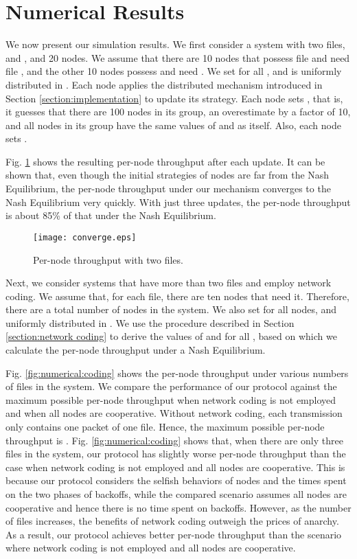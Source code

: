 \documentclass[11pt, conference]{IEEEtran}
\begin{document}
\section{Numerical Results} \label{section:numerical}

We now present our simulation results. We first consider a system with two files,  and , and 20 nodes. We assume that there are 10 nodes that possess file  and need file , and the other 10 nodes possess  and need . We set  for all , and  is uniformly distributed in . Each node applies the distributed mechanism introduced in Section \ref{section:implementation} to update its strategy. Each node  sets , that is, it guesses that there are 100 nodes in its group, an overestimate by a factor of 10, and all nodes in its group have the same values of  and  as itself. Also, each node sets .

Fig. \ref{fig:numerical:converge} shows the resulting per-node throughput after each update. It can be shown that, even though the initial strategies of nodes are far from the Nash Equilibrium, the per-node throughput under our mechanism converges to the Nash Equilibrium very quickly. With just three updates, the per-node throughput is about 85\% of that under the Nash Equilibrium.

\begin{figure}[t]
\texttt{[image: converge.eps]}
\caption{Per-node throughput with two files.} \label{fig:numerical:converge}
\end{figure}







Next, we consider systems that have more than two files and employ network coding. We assume that, for each file, there are ten nodes that need it. Therefore, there are a total number of  nodes in the system. We also set  for all nodes, and  uniformly distributed in . We use the procedure described in Section \ref{section:network coding} to derive the values of  and  for all , based on which we calculate the per-node throughput under a Nash Equilibrium.

Fig. \ref{fig:numerical:coding} shows the per-node throughput under various numbers of files in the system. We compare the performance of our protocol against the maximum possible per-node throughput when network coding is not employed and when all nodes are cooperative. Without network coding, each transmission only contains one packet of one file. Hence, the maximum possible per-node throughput is . Fig. \ref{fig:numerical:coding} shows that, when there are only three files in the system, our protocol has slightly worse per-node throughput than the case when network coding is not employed and all nodes are cooperative. This is because our protocol considers the selfish behaviors of nodes and the times spent on the two phases of backoffs, while the compared scenario assumes all nodes are cooperative and hence there is no time spent on backoffs. However, as the number of files increases, the benefits of network coding outweigh the prices of anarchy. As a result, our protocol achieves better per-node throughput than the scenario where network coding is not employed and all nodes are cooperative.
\end{document}
